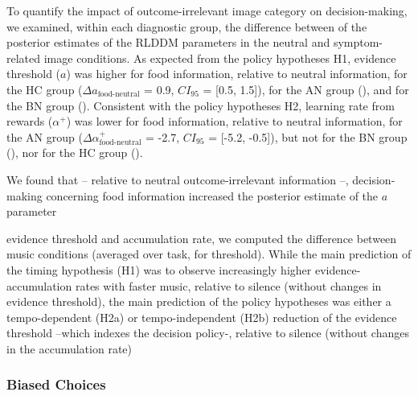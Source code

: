 \documentclass[
  man,floatsintext]{apa6}
\begin{document}
To quantify the impact of outcome-irrelevant image category on decision-making, we examined, within each diagnostic group, the difference between of the posterior estimates of the RLDDM parameters in the neutral and symptom-related image conditions. As expected from the policy hypotheses H1, evidence threshold (\(a\)) was higher for food information, relative to neutral information, for the HC group (\(\Delta a_{\text{food-neutral}}\) = 0.9, \(CI_{95}\) = {[}0.5, 1.5{]}), for the AN group (), and for the BN group (). Consistent with the policy hypotheses H2, learning rate from rewards (\(\alpha^+\)) was lower for food information, relative to neutral information, for the AN group (\(\Delta \alpha^+_{\text{food-neutral}}\) = -2.7, \(CI_{95}\) = {[}-5.2, -0.5{]}), but not for the BN group (), nor for the HC group ().

We found that -- relative to neutral outcome-irrelevant information --, decision-making concerning food information increased the posterior estimate of the \(a\) parameter

evidence threshold and accumulation rate, we computed the difference between music conditions (averaged over task, for threshold). While the main prediction of the timing hypothesis (H1) was to observe increasingly higher evidence- accumulation rates with faster music, relative to silence (without changes in evidence threshold), the main prediction of the policy hypotheses was either a tempo-dependent (H2a) or tempo-independent (H2b) reduction of the evidence threshold --which indexes the decision policy-, relative to silence (without changes in the accumulation rate)

\hypertarget{biased-choices}{%
\subsubsection{Biased Choices}\label{biased-choices}}
\end{document}
